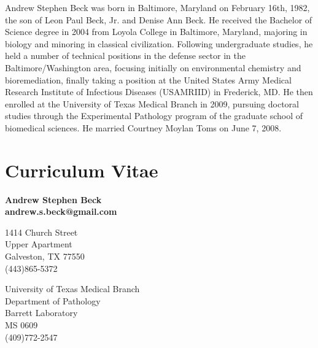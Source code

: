 \documentclass[11pt]{report}	%
\theoremstyle{definition}
\theoremstyle{remark}
\begin{document}
\begin{vita}
Andrew Stephen Beck was born in Baltimore, Maryland on February 16th,
1982, the son of Leon Paul Beck, Jr. and Denise Ann Beck. He received
the Bachelor of Science degree in 2004 from Loyola College in Baltimore, Maryland, majoring in biology
and minoring in classical civilization. Following undergraduate
studies, he held a number of technical positions in the defense sector in the 
Baltimore/Washington area, focusing initially on environmental chemistry and 
bioremediation, finally taking a position at the United States Army Medical Research Institute
of Infectious Diseases (USAMRIID) in Frederick, MD. He then enrolled at the University 
of Texas Medical Branch in 2009, pursuing doctoral studies through the 
Experimental Pathology program of the graduate school of biomedical sciences. 
He married Courtney Moylan Toms on June 7, 2008.


\end{vita}

\chapter*{Curriculum Vitae}

\tabulinesep=1.2mm

\begin{center}
\textbf{\LARGE Andrew Stephen Beck}\\
\textbf{andrew.s.beck@gmail.com}
\end{center}

\begin{minipage}[ht]{0.48\textwidth}
	1414 Church Street\\
	Upper Apartment\\
	Galveston, TX 77550\\
	(443)865-5372
\end{minipage}
\begin{minipage}[ht]{0.48\columnwidth}
	University of Texas Medical Branch\\ 
	Department of Pathology\\
	Barrett Laboratory\\
	MS 0609\\
	(409)772-2547
\end{minipage}
\end{document}
